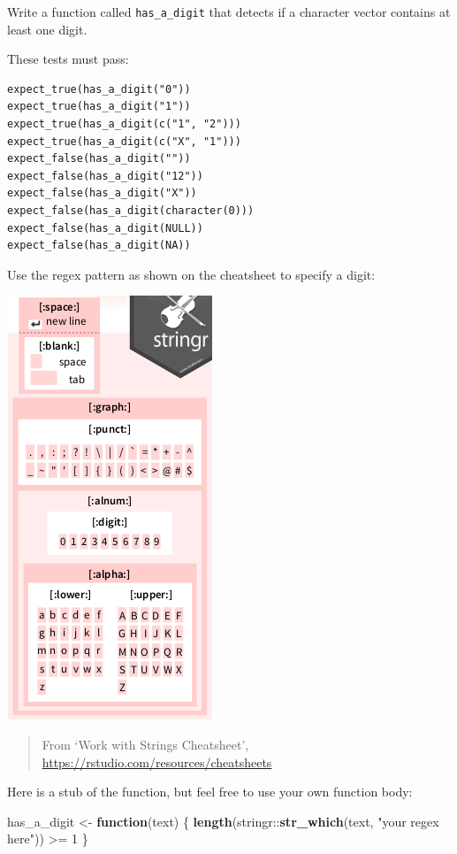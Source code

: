 \documentclass[]{book}
\newenvironment{Shaded}{}{}
\newcommand{\ControlFlowTok}[1]{\textcolor[rgb]{0.00,0.44,0.13}{\textbf{#1}}}
\newcommand{\DecValTok}[1]{\textcolor[rgb]{0.25,0.63,0.44}{#1}}
\newcommand{\KeywordTok}[1]{\textcolor[rgb]{0.00,0.44,0.13}{\textbf{#1}}}
\newcommand{\NormalTok}[1]{#1}
\newcommand{\OperatorTok}[1]{\textcolor[rgb]{0.40,0.40,0.40}{#1}}
\newcommand{\StringTok}[1]{\textcolor[rgb]{0.25,0.44,0.63}{#1}}
\begin{document}
Write a function called \texttt{has\_a\_digit} that detects if a
character vector contains at least one digit.

These tests must pass:

\begin{verbatim}
expect_true(has_a_digit("0"))
expect_true(has_a_digit("1"))
expect_true(has_a_digit(c("1", "2")))
expect_true(has_a_digit(c("X", "1")))
expect_false(has_a_digit(""))
expect_false(has_a_digit("12"))
expect_false(has_a_digit("X"))
expect_false(has_a_digit(character(0)))
expect_false(has_a_digit(NULL))
expect_false(has_a_digit(NA))
\end{verbatim}

Use the regex pattern as shown on the cheatsheet to specify a digit:

\includegraphics{data/06_character_sets.png}

\begin{quote}
From `Work with Strings Cheatsheet', \url{https://rstudio.com/resources/cheatsheets}
\end{quote}

Here is a stub of the function, but feel free to use your own function body:

\begin{Shaded}
\begin{Highlighting}[]
\NormalTok{has_a_digit <-}\StringTok{ }\ControlFlowTok{function}\NormalTok{(text) \{}
  \KeywordTok{length}\NormalTok{(stringr}\OperatorTok{::}\KeywordTok{str_which}\NormalTok{(text, }\StringTok{"your regex here"}\NormalTok{)) }\OperatorTok{>=}\StringTok{ }\DecValTok{1}
\NormalTok{\}}
\end{Highlighting}
\end{Shaded}
\end{document}
